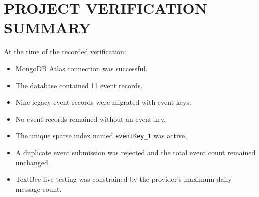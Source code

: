 \documentclass[12pt,a4paper,oneside]{report}
\begin{document}
\chapter{PROJECT VERIFICATION SUMMARY}
At the time of the recorded verification:
\begin{itemize}
  \item MongoDB Atlas connection was successful.
  \item The database contained 11 event records.
  \item Nine legacy event records were migrated with event keys.
  \item No event records remained without an event key.
  \item The unique sparse index named \texttt{eventKey\_1} was active.
  \item A duplicate event submission was rejected and the total event count remained unchanged.
  \item TextBee live testing was constrained by the provider's maximum daily message count.
\end{itemize}
\end{document}
